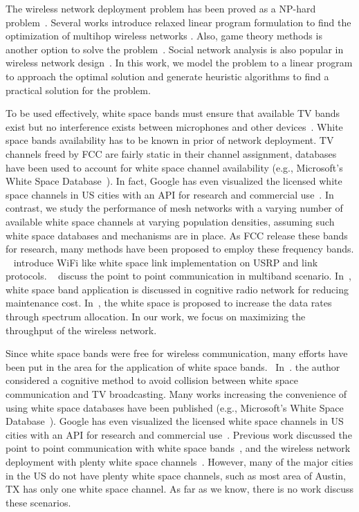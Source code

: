 The wireless network deployment problem has been 
proved as a NP-hard problem~\cite{doraghinejad2014channel}. 
Several works introduce relaxed linear program formulation 
to find the optimization of multihop wireless networks 
\cite{tang2005interference,irwin2013resource,filippini2013new}.  
Also, game theory methods is another option to solve 
the problem~\cite{raniwala2005architecture,
wang2010game}.  
Social network analysis is also popular in wireless 
network design~\cite{zhu2013survey}.
In this work, we model the problem to a linear program
to approach the optimal solution and generate heuristic
algorithms to find a practical solution for the problem.

To be used effectively, white space bands must ensure that available TV bands
exist but no interference exists between microphones and other devices~\cite{bahl2009white}. 
White space bands availability has to be known in prior of network deployment.
TV channels freed by FCC are fairly static in their channel assignment, 
databases have been used to account for white space channel availability 
(e.g., Microsoft's White Space Database~\cite{msdatabase}).
In fact, Google has even visualized the licensed white space channels 
in US cities with an API for research and commercial use~\cite{googledatabase}.
In contrast, we study the performance of mesh networks with a varying number 
of available white space channels at varying population densities, assuming 
such white space databases and mechanisms are in place. As FCC release these 
bands for research, many methods have been proposed to employ these frequency bands.
~\cite{bahl2009white} introduce WiFi like white space link implementation on USRP and 
link protocols. ~\cite{cui2013leveraging} discuss the point to point communication
in multiband scenario. In~\cite{filippini2013new}, white space band application is 
discussed in cognitive radio network for reducing maintenance cost. 
In~\cite{deb2009dynamic}, the white space is proposed to increase the 
data rates through spectrum allocation. 
In our work, we focus on maximizing the throughput of the wireless network.


Since white space bands were free for wireless communication, many efforts have been 
put in the area for the application of white space bands.~\cite{fccwhitespace} 
In~\cite{bahl2009white}. the author considered a cognitive method to avoid collision 
between white space communication and TV broadcasting. 
Many works increasing the convenience of using white space databases have been published 
(e.g., Microsoft's White Space Database~\cite{msdatabase}).
Google has even visualized the licensed white space channels 
in US cities with an API for research and commercial use~\cite{googledatabase}.
Previous work discussed the point to point communication with white space bands~\cite{cui2013leveraging}, 
and the wireless network deployment with plenty white space channels~\cite{pcuiwinmee}.
However, many of the major cities in the US do not have plenty white space channels, such as 
most area of Austin, TX has only one white space channel. As far as we know, there is no work 
discuss these scenarios.



